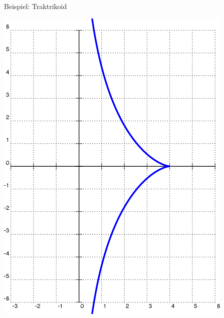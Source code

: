\documentclass[12pt]{beamer}
\begin{document}
\begin{frame}{Beispiel: Traktrikoid}

\begin{center}
\includegraphics[scale=0.2]{traktrix.png}
\end{center}

\end{frame}
\end{document}
